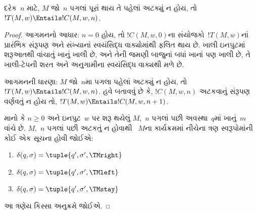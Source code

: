 \begin{lem}
દરેક~$n$ માટે, $M$ જો~$n$ પગલાં પૂરાં થાય તે
પહેલાં અટક્યું ન હોય, તો
$!T(M, w) \Entails !C(M, w, n)$.
\end{lem}

\begin{proof}
આગમનનો આધાર: $n = 0$ હોય, તો
$!C(M, w, 0)$ના સંયોજકો~$!T(M,w)$નાં
પ્રારંભિક સંરૂપણ અને સંખ્યાનાં સ્વયંસિદ્ધ વાક્યોમાંથી
ફલિત થાય છે. ખાલી ઇનપુટમાં શરૂઆતથી વાંચાતું
ખાનું ખાલી છે, અને તેની જમણી બાજુનાં બધાં
ખાનાં પણ ખાલી છે, તે ખાલી-ટેપની શરત અને
અનુગામીના સ્વયંસિદ્ધ વાક્યથી મળે છે.

આગમનની ધારણા: $M$ જો~$n$મા પગલા પહેલાં
અટક્યું ન હોય, તો $!T(M,w) \Entails !C(M, w, n)$.
હવે બતાવવું છે કે, $!C(M, w, n)$ અટકવાનું સંરૂપણ
વર્ણવતું ન હોય તો,
$!T(M, w) \Entails !C(M, w, n+1)$.

માનો કે $n \ge 0$ અને ઇનપુટ~$w$ પર શરૂ થયેલું
$M$,~$n$ પગલાં પછી અવસ્થા~$q$માં ખાનું~$m$
વાંચે છે. $M$,~$n$ પગલાં પછી અટકતું ન હોવાથી
~$M$ના કાર્યક્રમમાં નીચેના ત્રણ સ્વરૂપોમાંની કોઈ એક
સૂચના હોવી જોઈએ:

\begin{enumerate}
\item {} $\delta(q, \sigma) = \tuple{q', \sigma', \TMright}$

\item {} $\delta(q, \sigma) = \tuple{q', \sigma', \TMleft}$

\item {} $\delta(q, \sigma) = \tuple{q', \sigma', \TMstay}$
\end{enumerate}

આ ત્રણેય કિસ્સા અનુક્રમે જોઈએ.


\end{proof}

